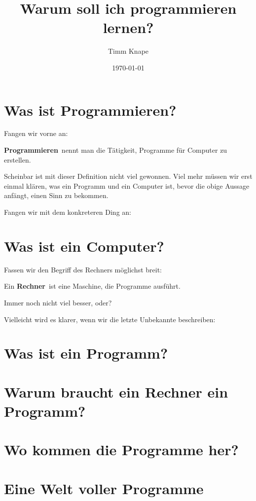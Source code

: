 \documentclass[a5paper,ngerman]{article}
\title{\color{emph}Warum soll ich programmieren lernen?}
\author{Timm Knape}
\date{\today}
\begin{document}
\pagecolor{background}
\color{normal}
\allsectionsfont{\color{emph}\mdseries}
\pagestyle{plain}
\maketitle
\thispagestyle{fancy}
\begin{multicols}{2}

\end{multicols}
\section{Was ist Programmieren?}
\begin{multicols}{2}

Fangen wir vorne an:

\textbf{Programmieren}\ nennt man die Tätigkeit, Programme für Computer zu
erstellen.

Scheinbar ist mit dieser Definition nicht viel gewonnen.
Viel mehr müssen wir erst einmal klären, was ein Programm und ein
Computer ist, bevor die obige Aussage anfängt, einen Sinn zu bekommen.

Fangen wir mit dem konkreteren Ding an:

\end{multicols}
\section{Was ist ein Computer?}
\begin{multicols}{2}

Fassen wir den Begriff des Rechners möglichst breit:

Ein \textbf{Rechner}\ ist eine Maschine, die Programme ausführt.

Immer noch nicht viel besser, oder?

Vielleicht wird es klarer, wenn wir die letzte Unbekannte beschreiben:

\end{multicols}
\section{Was ist ein Programm?}
\begin{multicols}{2}

\end{multicols}
\section{Warum braucht ein Rechner ein Programm?}
\begin{multicols}{2}

\end{multicols}
\section{Wo kommen die Programme her?}
\begin{multicols}{2}

\end{multicols}
\section{Eine Welt voller Programme}
\end{document}
